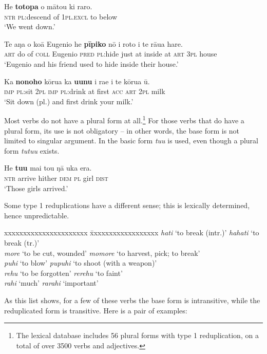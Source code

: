\ea\label{ex:2.15}
\gll He \textbf{totopa} o mātou ki raro. \\
\textsc{ntr} \textsc{pl}:descend of \textsc{1pl.excl} to below \\

\glt 
‘We went down.’ \textstyleExampleref{[R157.040]} 
\z

\ea\label{ex:2.16}
\gll Te aŋa o koā Eugenio he \textbf{pīpiko} nō {\ꞌ}i roto i te rāua hare. \\
\textsc{art} do of \textsc{coll} Eugenio \textsc{pred} \textsc{pl}:hide just at inside at \textsc{art} \textsc{3pl} house \\

\glt 
‘Eugenio and his friend used to hide inside their house.’ \textstyleExampleref{[R231.279]} 
\z

\ea\label{ex:2.17}
\gll Ka \textbf{nonoho} kōrua ka \textbf{uunu} {\ꞌ}i ra{\ꞌ}e i te kōrua ū. \\
\textsc{imp} \textsc{pl}:sit \textsc{2pl} \textsc{imp} \textsc{pl}:drink at first \textsc{acc} \textsc{art} \textsc{2pl} milk \\

\glt
‘Sit down (pl.) and first drink your milk.’ \textstyleExampleref{[R334.117]} 
\z

Most verbs do not have a plural form at all.\footnote{\label{fn:82}The lexical database includes 56 plural forms with type 1 reduplication, on a total of over 3500 verbs and adjectives.} For those verbs that do have a plural form, its use is not obligatory – in other words, the base form is not limited to singular argument. In  the basic form \textit{tu{\ꞌ}u} is used, even though a plural form \textit{tutu{\ꞌ}u} exists.

\ea\label{ex:2.18}
\gll He \textbf{tu{\ꞌ}u} mai tou ŋā uka era. \\
\textsc{ntr} arrive hither \textsc{dem} \textsc{pl} girl \textsc{dist} \\

\glt 
‘Those girls arrived.’ \textstyleExampleref{[Blx-3.053]}
\z

Some type 1 reduplications have a different sense; this is lexically determined, hence unpredictable. 
\ea
\begin{tabbing}
xxxxxxxxxxxxxxxxxxxxxx \= xxxxxxxxxxxxxxxxxx\kill
\textit{hati} ‘to break (intr.)’ \> \textit{hahati} ‘to break (tr.)’\\
\textit{more} ‘to be cut, wounded’ \> \textit{momore} ‘to harvest, pick; to break’\\
\textit{puhi} ‘to blow’ \> \textit{pupuhi} ‘to shoot (with a weapon)’\\
\textit{rehu} ‘to be forgotten’ \> \textit{rerehu} ‘to faint’\\
\textit{rahi} ‘much’ \> \textit{rarahi} ‘important’
\end{tabbing}
\z 
As this list shows, for a few of these verbs the base form is intransitive, while the reduplicated form is transitive. Here is a pair of examples:

